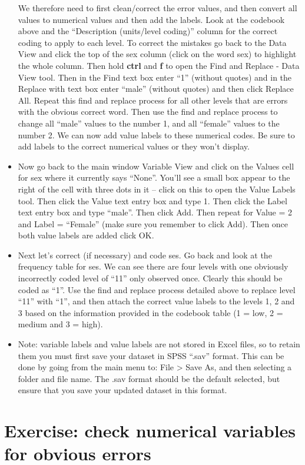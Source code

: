 \documentclass[
]{book}
\begin{document}
\begin{itemize}
  We therefore need to first clean/correct the error values, and then convert all values to numerical values and then add the labels. Look at the codebook above and the ``Description (units/level coding)'' column for the correct coding to apply to each level. To correct the mistakes go back to the Data View and click the top of the sex column (click on the word sex) to highlight the whole column. Then hold \textbf{ctrl} and \textbf{f} to open the Find and Replace - Data View tool. Then in the Find text box enter ``1'' (without quotes) and in the Replace with text box enter ``male'' (without quotes) and then click Replace All. Repeat this find and replace process for all other levels that are errors with the obvious correct word. Then use the find and replace process to change all ``male'' values to the number 1, and all ``female'' values to the number 2. We can now add value labels to these numerical codes. Be sure to add labels to the correct numerical values or they won't display.
\item
  Now go back to the main window Variable View and click on the Values cell for sex where it currently says ``None''. You'll see a small box appear to the right of the cell with three dots in it -- click on this to open the Value Labels tool. Then click the Value text entry box and type 1. Then click the Label text entry box and type ``male''. Then click Add. Then repeat for Value = 2 and Label = ``Female'' (make sure you remember to click Add). Then once both value labels are added click OK.
\item
  Next let's correct (if necessary) and code ses. Go back and look at the frequency table for ses. We can see there are four levels with one obviously incorrectly coded level of ``11'' only observed once. Clearly this should be coded as ``1''. Use the find and replace process detailed above to replace level ``11'' with ``1'', and then attach the correct value labels to the levels 1, 2 and 3 based on the information provided in the codebook table (1 = low, 2 = medium and 3 = high).
\item
  Note: variable labels and value labels are not stored in Excel files, so to retain them you must first save your dataset in SPSS ``.sav'' format. This can be done by going from the main menu to: File \textgreater{} Save As, and then selecting a folder and file name. The .sav format should be the default selected, but ensure that you save your updated dataset in this format.
\end{itemize}

\hypertarget{exercise-check-numerical-variables-for-obvious-errors}{%
\section{Exercise: check numerical variables for obvious errors}\label{exercise-check-numerical-variables-for-obvious-errors}}
\end{document}
